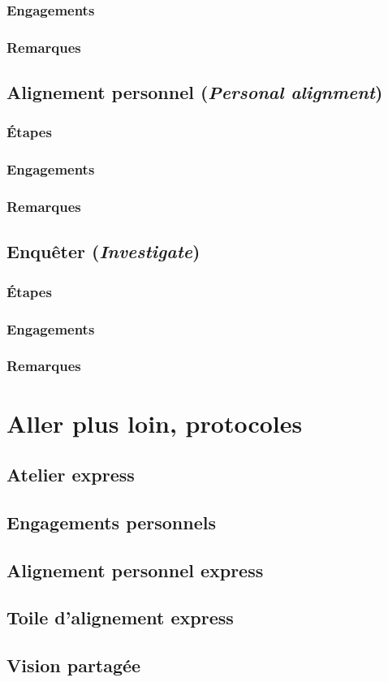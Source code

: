 \documentclass{book}
\begin{document}
\subsection{Engagements}
\subsection{Remarques}

\section{Alignement personnel (\emph{Personal alignment})}
\subsection{Étapes}
\subsection{Engagements}
\subsection{Remarques}

\section{Enquêter (\emph{Investigate})}
\subsection{Étapes}
\subsection{Engagements}
\subsection{Remarques}

\chapter{Aller plus loin, protocoles} \label{aller-plus-loin}

\section{Atelier express} \label{atelier-express}
\section{Engagements personnels} \label{engagements-personnels}
\section{Alignement personnel express} \label{alignement-personnel-express}
\section{Toile d'alignement express} \label{toile-alignement-express}
\section{Vision partagée} \label{vision-partagee}
\end{document}
